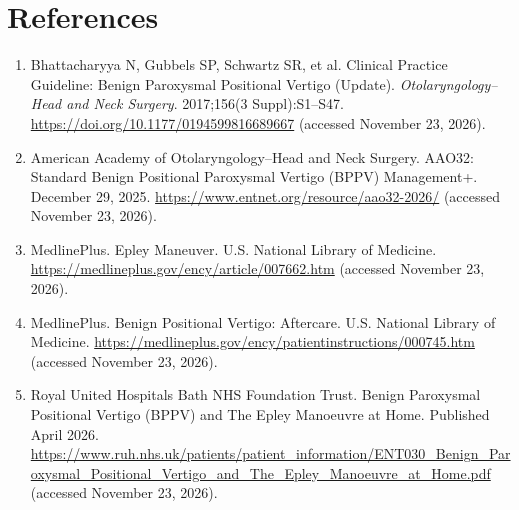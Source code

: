\section*{References}
\begin{enumerate}
  \item Bhattacharyya N, Gubbels SP, Schwartz SR, et al. Clinical Practice Guideline: Benign Paroxysmal Positional Vertigo (Update). \textit{Otolaryngology--Head and Neck Surgery}. 2017;156(3 Suppl):S1--S47. \url{https://doi.org/10.1177/0194599816689667} (accessed November 23, 2026).
  \item American Academy of Otolaryngology--Head and Neck Surgery. AAO32: Standard Benign Positional Paroxysmal Vertigo (BPPV) Management+. December 29, 2025. \url{https://www.entnet.org/resource/aao32-2026/} (accessed November 23, 2026).
  \item MedlinePlus. Epley Maneuver. U.S. National Library of Medicine. \url{https://medlineplus.gov/ency/article/007662.htm} (accessed November 23, 2026).
  \item MedlinePlus. Benign Positional Vertigo: Aftercare. U.S. National Library of Medicine. \url{https://medlineplus.gov/ency/patientinstructions/000745.htm} (accessed November 23, 2026).
  \item Royal United Hospitals Bath NHS Foundation Trust. Benign Paroxysmal Positional Vertigo (BPPV) and The Epley Manoeuvre at Home. Published April 2026. \url{https://www.ruh.nhs.uk/patients/patient_information/ENT030_Benign_Paroxysmal_Positional_Vertigo_and_The_Epley_Manoeuvre_at_Home.pdf} (accessed November 23, 2026).
\end{enumerate}

\clearpage
